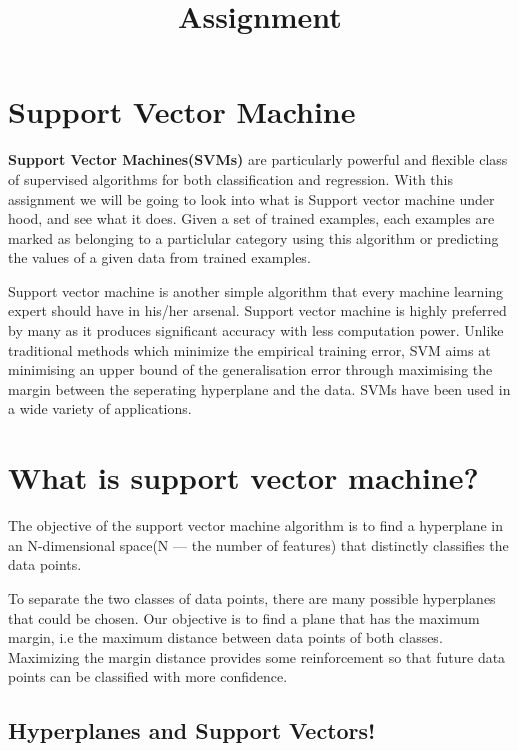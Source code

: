 \documentclass[11pt]{article}
\title{Assignment}
\begin{document}
    
    \maketitle
    
    

    
    \hypertarget{support-vector-machine}{%
\section{Support Vector Machine}\label{support-vector-machine}}

    \textbf{Support Vector Machines(SVMs)} are particularly powerful and
flexible class of supervised algorithms for both classification and
regression. With this assignment we will be going to look into what is
Support vector machine under hood, and see what it does. Given a set of
trained examples, each examples are marked as belonging to a particlular
category using this algorithm or predicting the values of a given data
from trained examples.

Support vector machine is another simple algorithm that every machine
learning expert should have in his/her arsenal. Support vector machine
is highly preferred by many as it produces significant accuracy with
less computation power. Unlike traditional methods which minimize the
empirical training error, SVM aims at minimising an upper bound of the
generalisation error through maximising the margin between the
seperating hyperplane and the data. SVMs have been used in a wide
variety of applications.

    \hypertarget{what-is-support-vector-machine}{%
\section{What is support vector
machine?}\label{what-is-support-vector-machine}}

The objective of the support vector machine algorithm is to find a
hyperplane in an N-dimensional space(N --- the number of features) that
distinctly classifies the data points.

To separate the two classes of data points, there are many possible
hyperplanes that could be chosen. Our objective is to find a plane that
has the maximum margin, i.e the maximum distance between data points of
both classes. Maximizing the margin distance provides some reinforcement
so that future data points can be classified with more confidence.

\hypertarget{hyperplanes-and-support-vectors}{%
\subsection{Hyperplanes and Support
Vectors!}\label{hyperplanes-and-support-vectors}}
\end{document}

